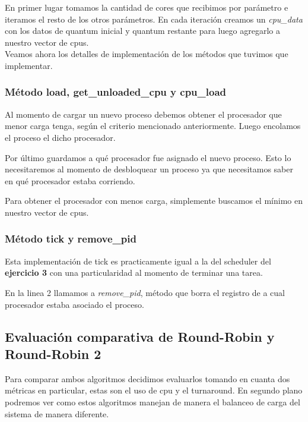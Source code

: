 \documentclass[a4paper,11pt]{article}
\begin{document}
			

			En primer lugar tomamos la cantidad de cores que recibimos por parámetro e iteramos el resto de los otros parámetros. En cada iteración creamos un \textit{cpu\_data} con los datos de quantum inicial y quantum restante para luego agregarlo a nuestro vector de cpus.\\
			
			Veamos ahora los detalles de implementación de los métodos que tuvimos que implementar.
			
		\subsubsection*{Método load, get\_unloaded\_cpu y cpu\_load}
			Al momento de cargar un nuevo proceso debemos obtener el procesador que menor carga tenga, según el criterio mencionado anteriormente. Luego encolamos el proceso el dicho procesador.
	
						
			
			Por último guardamos a qué procesador fue asignado el nuevo proceso. Esto lo necesitaremos al momento de desbloquear un proceso ya que necesitamos saber en qué procesador estaba corriendo.
			
			Para obtener el procesador con menos carga, simplemente buscamos el mínimo en nuestro vector de cpus.
	
			
			
		\subsubsection*{Método tick y remove\_pid}
			Esta implementación de tick es practicamente igual a la del scheduler del \textbf{ejercicio 3} con una particularidad al momento de terminar una tarea.
	
			
			
			En la linea 2 llamamos a \textit{remove\_pid}, método que borra el registro de a cual procesador estaba asociado el proceso.
	\subsection{Evaluación comparativa de Round-Robin y Round-Robin 2}
		Para comparar ambos algoritmos decidimos evaluarlos tomando en cuanta dos métricas en particular, estas son el uso de cpu y el turnaround. En segundo plano podremos ver como estos algoritmos manejan de manera el balanceo de carga del sistema de manera diferente.
		
\end{document}
